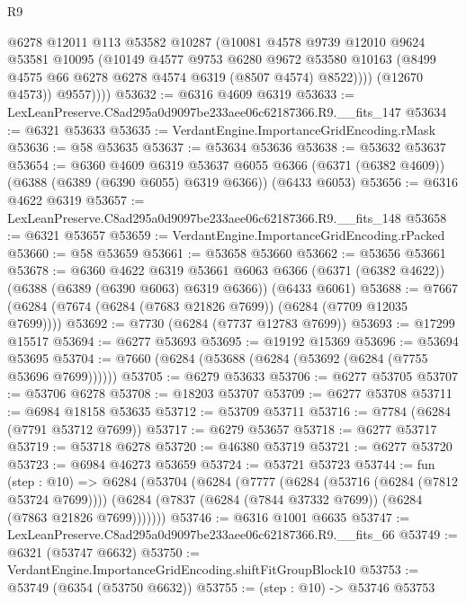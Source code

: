 \begin{lexlean}{R9}
\begin{coremodule}
                @6278
                @12011
                @113
                @53582
                @10287
                (@10081
                  @4578
                  @9739
                  @12010
                  @9624
                  @53581
                  @10095
                  (@10149
                    @4577
                    @9753
                    @6280
                    @9672
                    @53580
                    @10163
                    (@8499 @4575 @66 @6278 @6278 @4574 @6319 (@8507 @4574) @8522))))
              (@12670 @4573))
            @9557))))
@53632 := @6316 @4609 @6319
@53633 := LexLeanPreserve.C8ad295a0d9097be233aee06c62187366.R9.__fits_147
@53634 := @6321 @53633
@53635 := VerdantEngine.ImportanceGridEncoding.rMask
@53636 := @58 @53635
@53637 := @53634 @53636
@53638 := @53632 @53637
@53654 := @6360
    @4609
    @6319
    @53637
    @6055
    @6366
    (@6371 (@6382 @4609))
    (@6388 (@6389 (@6390 @6055) @6319 @6366))
    (@6433 @6053)
@53656 := @6316 @4622 @6319
@53657 := LexLeanPreserve.C8ad295a0d9097be233aee06c62187366.R9.__fits_148
@53658 := @6321 @53657
@53659 := VerdantEngine.ImportanceGridEncoding.rPacked
@53660 := @58 @53659
@53661 := @53658 @53660
@53662 := @53656 @53661
@53678 := @6360
    @4622
    @6319
    @53661
    @6063
    @6366
    (@6371 (@6382 @4622))
    (@6388 (@6389 (@6390 @6063) @6319 @6366))
    (@6433 @6061)
@53688 := @7667 (@6284 (@7674 (@6284 (@7683 @21826 @7699)) (@6284 (@7709 @12035 @7699))))
@53692 := @7730 (@6284 (@7737 @12783 @7699))
@53693 := @17299 @15517
@53694 := @6277 @53693
@53695 := @19192 @15369
@53696 := @53694 @53695
@53704 := @7660 (@6284 (@53688 (@6284 (@53692 (@6284 (@7755 @53696 @7699))))))
@53705 := @6279 @53633
@53706 := @6277 @53705
@53707 := @53706 @6278
@53708 := @18203 @53707
@53709 := @6277 @53708
@53711 := @6984 @18158 @53635
@53712 := @53709 @53711
@53716 := @7784 (@6284 (@7791 @53712 @7699))
@53717 := @6279 @53657
@53718 := @6277 @53717
@53719 := @53718 @6278
@53720 := @46380 @53719
@53721 := @6277 @53720
@53723 := @6984 @46273 @53659
@53724 := @53721 @53723
@53744 := fun (step : @10) =>
  @6284
    (@53704
      (@6284
        (@7777
          (@6284 (@53716 (@6284 (@7812 @53724 @7699))))
          (@6284 (@7837 (@6284 (@7844 @37332 @7699)) (@6284 (@7863 @21826 @7699)))))))
@53746 := @6316 @1001 @6635
@53747 := LexLeanPreserve.C8ad295a0d9097be233aee06c62187366.R9.__fits_66
@53749 := @6321 (@53747 @6632)
@53750 := VerdantEngine.ImportanceGridEncoding.shiftFitGroupBlock10
@53753 := @53749 (@6354 (@53750 @6632))
@53755 := (step : @10) -> @53746 @53753

\end{coremodule}
\end{lexlean}
